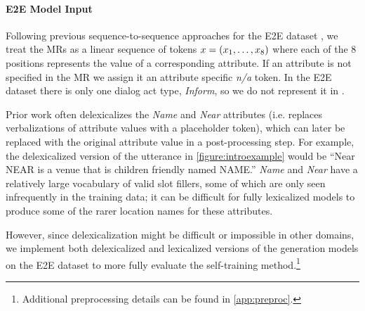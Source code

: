 \paragraph{E2E Model Input}
Following previous sequence-to-sequence approaches for the E2E dataset 
\cite{juraskaslug2slug},
we treat the MRs as a linear sequence of tokens
$x = (x_1, \ldots, x_8)$ where each of the 8 positions represents
the value of a corresponding attribute.
If an attribute is not specified
in the MR we assign it an attribute specific \textit{n/a} token.
In the E2E dataset  there is only one dialog act type, \textit{Inform}, 
so we do not represent it in \mrx.



Prior work often delexicalizes the \textit{Name} and \textit{Near} 
attributes (i.e. replaces verbalizations of attribute values with a
placeholder token), which can later be replaced with the original
attribute value in a post-processing step. 
For example, the delexicalized version of the utterance in 
\autoref{figure:introexample}
would be ``Near NEAR is a venue that is children friendly named NAME.''
\textit{Name} and \textit{Near}  have a relatively large vocabulary of valid slot fillers, some of which are only seen  infrequently in the training data;
it can be difficult for fully lexicalized models to produce some of the 
rarer location names for these attributes. 

However, since delexicalization might be difficult or 
impossible in other domains, we implement both delexicalized and lexicalized
versions of the generation models on the E2E dataset to 
more fully evaluate the
self-training method.\footnote{
    Additional preprocessing details can be found in \autoref{app:preproc}.}




